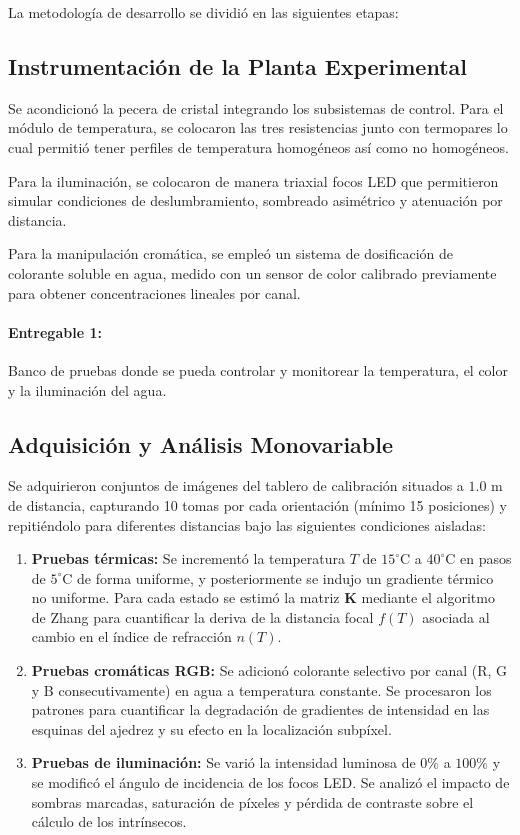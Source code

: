 \documentclass[12pt,letterpaper,spanish,twoside,openright]{report}
\begin{document}
La metodología de desarrollo se dividió en las siguientes etapas:

\subsection{Instrumentación de la Planta Experimental}
Se acondicionó la pecera de cristal integrando los subsistemas de control. Para el módulo de temperatura, se colocaron las tres resistencias junto con termopares lo cual permitió tener perfiles de temperatura homogéneos así como no homogéneos. 

Para la iluminación, se colocaron de manera triaxial focos LED que permitieron simular condiciones de deslumbramiento, sombreado asimétrico y atenuación por distancia.

Para la manipulación cromática, se empleó un sistema de dosificación de colorante soluble en agua, medido con un sensor de color calibrado previamente para obtener concentraciones lineales por canal.

\paragraph{Entregable 1:} Banco de pruebas donde se pueda controlar y monitorear la temperatura, el color y la iluminación del agua.

\subsection{Adquisición y Análisis Monovariable}
Se adquirieron conjuntos de imágenes del tablero de calibración situados a $1.0\text{ m}$ de distancia, capturando 10 tomas por cada orientación (mínimo 15 posiciones) y repitiéndolo para diferentes distancias bajo las siguientes condiciones aisladas:

\begin{enumerate}[noitemsep]
    \item \textbf{Pruebas térmicas:} Se incrementó la temperatura $T$ de $15^\circ\text{C}$ a $40^\circ\text{C}$ en pasos de $5^\circ\text{C}$ de forma uniforme, y posteriormente se indujo un gradiente térmico no uniforme. Para cada estado se estimó la matriz $\mathbf{K}$ mediante el algoritmo de Zhang \parencite{calZhang} para cuantificar la deriva de la distancia focal $f(T)$ asociada al cambio en el índice de refracción $n(T)$.
    \item \textbf{Pruebas cromáticas RGB:} Se adicionó colorante selectivo por canal (R, G y B consecutivamente) en agua a temperatura constante. Se procesaron los patrones para cuantificar la degradación de gradientes de intensidad en las esquinas del ajedrez y su efecto en la localización subpíxel.
    \item \textbf{Pruebas de iluminación:} Se varió la intensidad luminosa de $0\%$ a $100\%$ y se modificó el ángulo de incidencia de los focos LED. Se analizó el impacto de sombras marcadas, saturación de píxeles y pérdida de contraste sobre el cálculo de los intrínsecos.
\end{enumerate}
\end{document}
